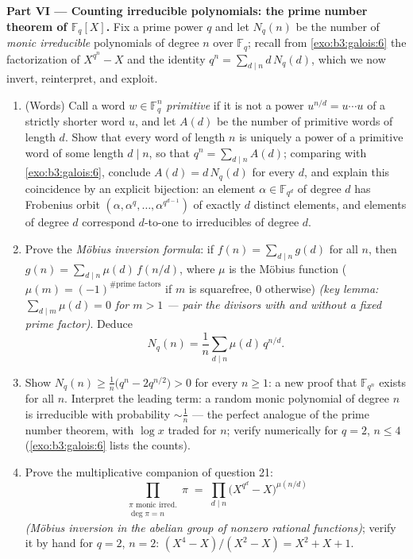 \begin{problem}
\medskip
\noindent\textbf{Part VI --- Counting irreducible polynomials:
the prime number theorem of $\mathbb F_q[X]$.} Fix a prime power
$q$ and let $N_q(n)$ be the number of \emph{monic irreducible}
polynomials of degree $n$ over $\mathbb F_q$; recall from
\cref{exo:b3:galois:6} the factorization of $X^{q^n} - X$ and
the identity $q^n = \sum_{d\mid n}d\,N_q(d)$, which we now
invert, reinterpret, and exploit.
\begin{enumerate}[resume]
  \item (Words) Call a word $w \in \mathbb F_q^n$
        \emph{primitive} if it is not a power $u^{n/d} =
        u\cdots u$ of a strictly shorter word $u$, and let
        $A(d)$ be the number of primitive words of length $d$.
        Show that every word of length $n$ is uniquely a power
        of a primitive word of some length $d \mid n$, so that
        $q^n = \sum_{d \mid n}A(d)$; comparing with
        \cref{exo:b3:galois:6}, conclude $A(d) = d\,N_q(d)$
        for every $d$, and explain this coincidence by an
        explicit bijection: an element $\alpha \in
        \mathbb F_{q^d}$ of degree $d$ has Frobenius orbit
        $(\alpha, \alpha^q, \dots, \alpha^{q^{d-1}})$ of
        exactly $d$ distinct elements, and elements of degree
        $d$ correspond $d$-to-one to irreducibles of degree
        $d$.
  \item Prove the \emph{M\"obius inversion formula}: if $f(n) =
        \sum_{d\mid n}g(d)$ for all $n$, then $g(n) =
        \sum_{d\mid n}\mu(d)\,f(n/d)$, where $\mu$ is the
        M\"obius function ($\mu(m) = (-1)^{\#\text{prime
        factors}}$ if $m$ is squarefree, $0$ otherwise)
        \emph{(key lemma: $\sum_{d \mid m}\mu(d) = 0$ for $m >
        1$ --- pair the divisors with and without a fixed prime
        factor)}. Deduce
        \[
        N_q(n) = \frac1n\sum_{d \mid n}\mu(d)\,q^{n/d} .
        \]
  \item Show $N_q(n) \geq \frac1n\bigl(q^n - 2q^{n/2}\bigr) > 0$
        for every $n \geq 1$: a new proof that $\mathbb F_{q^n}$
        exists for all $n$. Interpret the leading term: a random
        monic polynomial of degree $n$ is irreducible with
        probability $\sim \frac1n$ --- the perfect analogue of
        the prime number theorem, with $\log x$ traded for $n$;
        verify numerically for $q = 2$, $n \leq 4$
        (\cref{exo:b3:galois:6} lists the counts).
  \item Prove the multiplicative companion of question 21:
        \[
        \prod_{\substack{\pi \text{ monic irred.}\\ \deg\pi =
        n}}\pi \;=\; \prod_{d \mid n}
        \bigl(X^{q^d} - X\bigr)^{\mu(n/d)}
        \]
        \emph{(M\"obius inversion in the abelian group of
        nonzero rational functions)}; verify it by hand for $q
        = 2$, $n = 2$: $(X^4 - X)/(X^2 - X) = X^2 + X + 1$.
\end{enumerate}


\end{problem}
